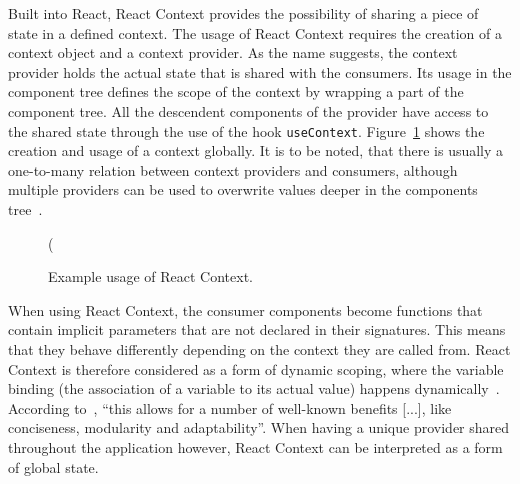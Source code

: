 Built into React, React Context provides the possibility of sharing a
piece of state in a defined context. The usage of React Context requires
the creation of a context object and a context provider. As the name
suggests, the context provider holds the actual state that is shared
with the consumers. Its usage in the component tree defines the scope
of the context by wrapping a part of the component tree. All the
descendent components of the provider have access to the shared state
through the use of the hook \texttt{useContext}. Figure~\ref{code_example_of_react_context} shows the
creation and usage of a context globally. It is to be noted, that there
is usually a one-to-many relation between context providers and
consumers, although multiple providers can be used to overwrite values
deeper in the components tree~\cite{react_context}.

\begin{figure}
\begin{Shaded}
\begin{Highlighting}[]

\NormalTok{\}) =\textgreater{} \{}
 (
\NormalTok{    );}
\NormalTok{\};}

\end{Highlighting}
\end{Shaded}
\caption{Example usage of React Context.}
\label{code_example_of_react_context}
\end{figure}

When using React Context, the consumer components become functions that
contain implicit parameters that are not declared in their signatures.
This means that they behave differently depending on the context they
are called from. React Context is therefore considered as a form of
dynamic scoping, where the variable binding (the association of a
variable to its actual value) happens dynamically~\cite{dynamic_scoping}.
According to~\cite{dynamic_scoping}, ``this allows for a number of well-known benefits
[...], like conciseness, modularity and adaptability''. When having a
unique provider shared throughout the application however, React Context
can be interpreted as a form of global state.

